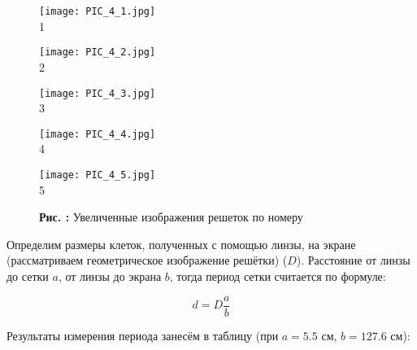\documentclass[12pt,a4paper]{article}
\newcounter{picture}
\begin{document}
	\begin{figure}[h]
		\begin{minipage}{0.33\linewidth}
			\begin{center}
				\texttt{[image: PIC\_4\_1.jpg]}
				\\1
			\end{center}
		\end{minipage}
		\begin{minipage}{0.33\linewidth}
			\begin{center}
				\texttt{[image: PIC\_4\_2.jpg]}
				\\2
			\end{center}
		\end{minipage}
		\begin{minipage}{0.33\linewidth}
			\begin{center}
				\texttt{[image: PIC\_4\_3.jpg]}
				\\3
			\end{center}
		\end{minipage}
	\end{figure}
	\begin{figure}[h]
		\begin{minipage}{0.5\linewidth}
			\begin{center}
				\texttt{[image: PIC\_4\_4.jpg]}
				\\4
			\end{center}
		\end{minipage}
		\begin{minipage}{0.5\linewidth}
			\begin{center}
				\texttt{[image: PIC\_4\_5.jpg]}
				\\5
			\end{center}
		\end{minipage}
		\begin{center}
			\textbf{Рис. \thepicture:} Увеличенные изображения решеток по номеру
			\label{pic_\thepicture}
			\addtocounter{picture}{1}
		\end{center}
	\end{figure}
	
	Определим размеры клеток, полученных с помощью линзы, на экране (рассматриваем геометрическое изображение решётки) ($D$). Расстояние от линзы до сетки $a$, от линзы до экрана $b$, тогда период сетки считается по формуле:
	
	$$d = D\frac{a}{b}$$
	
	Результаты измерения периода занесём в таблицу (при $a = 5.5$ см, $b = 127.6$ см):
\end{document}
